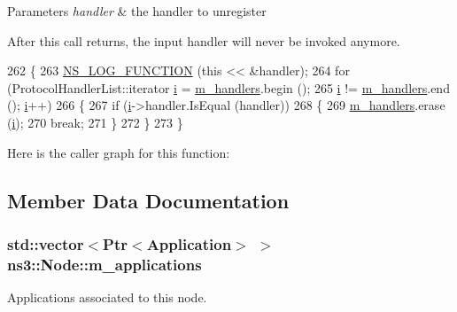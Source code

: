 \begin{DoxyParams}{Parameters}
{\em handler} & the handler to unregister\\
\hline
\end{DoxyParams}
After this call returns, the input handler will never be invoked anymore. 
\begin{DoxyCode}
262 \{
263   \hyperlink{log-macros-disabled_8h_a90b90d5bad1f39cb1b64923ea94c0761}{NS\_LOG\_FUNCTION} (\textcolor{keyword}{this} << &handler);
264   \textcolor{keywordflow}{for} (ProtocolHandlerList::iterator \hyperlink{bernuolliDistribution_8m_a6f6ccfcf58b31cb6412107d9d5281426}{i} = \hyperlink{classns3_1_1Node_ab83de89d6f361c6fbb3a92f03523b8d0}{m\_handlers}.begin ();
265        \hyperlink{bernuolliDistribution_8m_a6f6ccfcf58b31cb6412107d9d5281426}{i} != \hyperlink{classns3_1_1Node_ab83de89d6f361c6fbb3a92f03523b8d0}{m\_handlers}.end (); \hyperlink{bernuolliDistribution_8m_a6f6ccfcf58b31cb6412107d9d5281426}{i}++)
266     \{
267       \textcolor{keywordflow}{if} (\hyperlink{bernuolliDistribution_8m_a6f6ccfcf58b31cb6412107d9d5281426}{i}->handler.IsEqual (handler))
268         \{
269           \hyperlink{classns3_1_1Node_ab83de89d6f361c6fbb3a92f03523b8d0}{m\_handlers}.erase (\hyperlink{bernuolliDistribution_8m_a6f6ccfcf58b31cb6412107d9d5281426}{i});
270           \textcolor{keywordflow}{break};
271         \}
272     \}
273 \}
\end{DoxyCode}


Here is the caller graph for this function\+:




\subsection{Member Data Documentation}
\subsubsection[{\texorpdfstring{m\+\_\+applications}{m_applications}}]{\setlength{\rightskip}{0pt plus 5cm}std\+::vector$<${\bf Ptr}$<${\bf Application}$>$ $>$ ns3\+::\+Node\+::m\+\_\+applications\hspace{0.3cm}{\ttfamily [private]}}\hypertarget{classns3_1_1Node_a3984bdbc05cc8a6d2eda6c41963f16f6}{}\label{classns3_1_1Node_a3984bdbc05cc8a6d2eda6c41963f16f6}


Applications associated to this node. 


